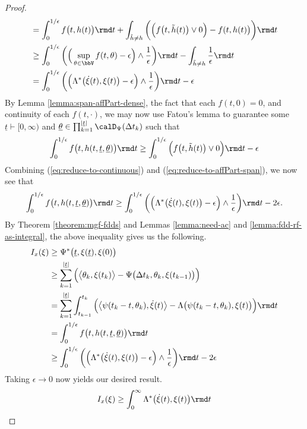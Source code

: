 \begin{proof}
\begin{align}
    \notag
    &= \int_0^{1/\epsilon}  f\big(t, \twistFunc(t)\big) \rmd t + \int_{\tilde\twistFunc\neq\twistFunc} \bigg(\Big( f\big(t, \tilde\twistFunc(t)\big) \vee 0 \Big) - f(t, \twistFunc(t)\big) \bigg)\rmd t \\
    \notag
    &\geq \int_0^{1/\epsilon}  \bigg( \Big( \sup_{\twistVar\in\vecSpace} f(t, \twistVar) - \epsilon \Big) \wedge \frac1\epsilon \bigg) \rmd t - \int_{\tilde\twistFunc\neq\twistFunc} \frac1\epsilon \rmd t \\
    &= \int_0^{1/\epsilon} \bigg( \Big( \ode^*\big(\dot\pathVar(t),\pathVar(t)\big) - \epsilon \Big) \wedge \frac1\epsilon \bigg) \rmd t - \epsilon
    \label{eq:reduce-to-continuous}
  \end{align}
  By Lemma \ref{lemma:span-affPart-dense}, the fact that each $f(t,0) = 0$, and continuity of each $f(t,\cdot)$, we may now use Fatou's lemma to guarantee some $\underline t \vdash [0,\infty)$ and $\underline\twistVar \in \prod_{k=1}^{|\underline t|} \momentSpace(\Delta t_k)$ such that
  \begin{equation}
    \label{eq:reduce-to-affPart-span}
    \int_0^{1/\epsilon} f\big(t, \twistFunc(t, \underline t, \underline\twistVar)\big) \rmd t
    \geq \int_0^{1/\epsilon} \Big( f\big(t, \tilde\twistFunc(t)\big) \vee 0 \Big) \rmd t - \epsilon
  \end{equation}
  Combining (\ref{eq:reduce-to-continuous}) and (\ref{eq:reduce-to-affPart-span}), we now see that
  \begin{equation*}
    \int_0^{1/\epsilon} f\big(t, \twistFunc(t, \underline t, \underline\twistVar)\big) \rmd t 
    \geq \int_0^{1/\epsilon} \bigg( \Big( \ode^*\big(\dot\pathVar(t),\pathVar(t)\big) - \epsilon \Big) \wedge \frac1\epsilon \bigg) \rmd t - 2\epsilon.
  \end{equation*}
  By Theorem \ref{theorem:mgf-fdds} and Lemmas \ref{lemma:need-ac} and \ref{lemma:fdd-rf-as-integral}, the above inequality gives us the following.
  \begin{align*}
    \rf_\stateVar(\pathVar)
    &\geq \aff^*\big(\underline t, \pathVar(\underline t), \pathVar(0)\big) \\
    &\geq\sum_{k=1}^{|\underline t|} \Big( \bprj{\twistVar_k}{\pathVar(t_k)} - \aff\big(\Delta t_k, \twistVar_k, \pathVar(t_{k-1})\big) \Big) \\
    &=\sum_{k=1}^{|\underline t|} \int_{t_{k-1}}^{t_k} \Big( \bprj{\affPart(t_k-t,\twistVar_k)}{\dot\pathVar(t)} - \ode\big(\affPart(t_k-t, \twistVar_k), \pathVar(t)\big) \Big) \rmd t \\
    &= \int_0^{1/\epsilon} f\big( t, \twistFunc(t, \underline t, \underline\twistVar)\big) \rmd t \\
    &\geq \int_0^{1/\epsilon} \bigg( \Big( \ode^*\big(\dot\pathVar(t),\pathVar(t)\big) - \epsilon \Big) \wedge \frac1\epsilon \bigg) \rmd t - 2\epsilon
  \end{align*}
  Taking $\epsilon \rightarrow 0$ now yields our desired result.
  \begin{equation*}
    \rf_\stateVar(\pathVar) \geq \int_0^\infty \ode^*\big(\dot\pathVar(t), \pathVar(t)\big) \rmd t
  \end{equation*}
\end{proof}

